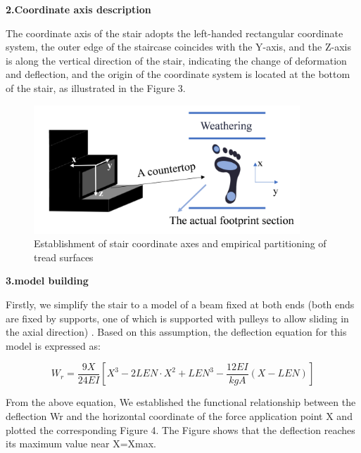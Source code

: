\documentclass{mcmthesis}
\begin{document}
\textbf{2.Coordinate axis description}

The coordinate axis of the stair adopts the left-handed rectangular coordinate system, the outer edge of the staircase coincides with the Y-axis, and the Z-axis is along the vertical direction of the stair, indicating the change of deformation and deflection, and the origin of the coordinate system is located at the bottom of the stair, as illustrated in the Figure 3.


\begin{figure}[h]  %
  \small
  \centering  %
  \includegraphics[width=10cm]{4-Establishment of stair coordinate axes and empirical partitioning of tread surfaces.png}
  \caption{Establishment of stair coordinate axes and empirical partitioning of tread surfaces} \label{fig:2}  %
  \end{figure}  %




\textbf{3.model building}

Firstly, we simplify the stair to a model of a beam fixed at both ends (both ends are fixed by supports, one of which is supported with pulleys to allow sliding in the axial direction) \cite{Levinson1981}\cite{SJZT20241216003}. Based on this assumption, the deflection equation for this model is expressed as:

\[ W_r = \frac{9X}{24EI} \left[ X^3 - 2LEN \cdot X^2 + LEN^3 - \frac{12EI}{kgA}(X - LEN) \right] \]

From the above equation, We established the functional relationship between the deflection Wr and the horizontal coordinate of the force application point X and plotted the corresponding Figure 4. The Figure shows that the deflection reaches its maximum value near X=Xmax.
\end{document}
